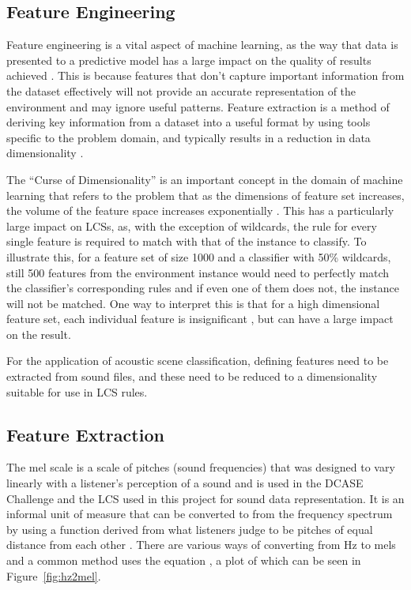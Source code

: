 \documentclass[11pt]{article}
\begin{document}
\subsection{Feature Engineering}
\label{sec:featEng}

Feature engineering is a vital aspect of machine learning, as the way that data is presented to a predictive model has a large impact on the quality of results achieved \cite{Brownlee2014}. This is because features that don't capture important information from the dataset effectively will not provide an accurate representation of the environment and may ignore useful patterns. Feature extraction is a method of deriving key information from a dataset into a useful format by using tools specific to the problem domain, and typically results in a reduction in data dimensionality \cite{Howbert2012}.

The ``Curse of Dimensionality'' is an important concept in the domain of machine learning that refers to the problem that as the dimensions of feature set increases, the volume of the feature space increases exponentially \cite{Keogh2010}. This has a particularly large impact on LCSs, as, with the exception of wildcards, the rule for every single feature is required to match with that of the instance to classify. To illustrate this, for a feature set of size 1000 and a classifier with 50\% wildcards, still 500 features from the environment instance would need to perfectly match the classifier's corresponding rules and if even one of them does not, the instance will not be matched. One way to interpret this is that for a high dimensional feature set, each individual feature is insignificant \cite{Keogh2010}, but can have a large impact on the result.

For the application of acoustic scene classification, defining features need to be extracted from sound files, and these need to be reduced to a dimensionality suitable for use in LCS rules.




\subsection{Feature Extraction}
\label{sec:featExt}

The mel scale is a scale of pitches (sound frequencies) that was designed to vary linearly with a listener's perception of a sound and is used in the DCASE Challenge and the LCS used in this project for sound data representation. It is an informal unit of measure that can be converted to from the frequency spectrum by using a function derived from what listeners judge to be pitches of equal distance from each other \cite{Luening1975}. There are various ways of converting from Hz to mels and a common method uses the equation  \cite{OShaughnessy1987}, a plot of which can be seen in Figure~\ref{fig:hz2mel}.
\end{document}

